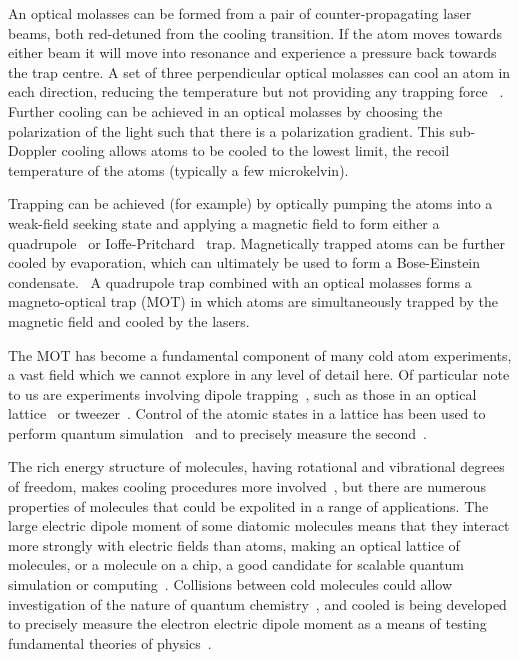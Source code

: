 An optical molasses can be formed from a pair of counter-propagating laser
beams, both red-detuned from the cooling transition. If the atom moves towards
either beam it will move into resonance and experience a pressure back towards
the trap centre. A set of three perpendicular optical molasses can cool an atom
in each direction, reducing the temperature but not providing any trapping
force~\cite{Metcalf1999} . Further cooling can be achieved in an optical
molasses by choosing the polarization of the light such that there is a
polarization gradient. This sub-Doppler cooling allows atoms to be cooled to the
lowest limit, the recoil temperature of the atoms (typically a few
microkelvin).~\cite{Dalibard:89}

Trapping can be achieved (for example) by optically pumping the atoms into a
weak-field seeking state and applying a magnetic field to form either a
quadrupole~\cite{PhysRevLett.54.2596} or
Ioffe-Pritchard~\cite{PhysRevLett.51.1336} trap. Magnetically trapped atoms can
be further cooled by evaporation, which can ultimately be used to form a
Bose-Einstein condensate.~\cite{Anderson198} A quadrupole trap combined with an
optical molasses forms a magneto-optical trap (MOT) in which atoms are
simultaneously trapped by the magnetic field and cooled by the
lasers.~\cite{PhysRevLett.59.2631}

The MOT has become a fundamental component of many cold atom experiments, a vast
field which we cannot explore in any level of detail here. Of particular note to
us are experiments involving dipole trapping~\cite{PhysRevA.47.R4567}, such as
those in an optical lattice~\cite{Bakr2009} or tweezer~\cite{Ashkin:86}. Control
of the atomic states in a lattice has been used to perform quantum
simulation~\cite{Gross995} and to precisely measure the
second~\cite{Campbell90}.

The rich energy structure of molecules, having rotational and vibrational
degrees of freedom, makes cooling procedures more involved~\cite{Tarbutt2018},
but there are numerous properties of molecules that could be expolited in a
range of applications. The large electric dipole moment of some diatomic
molecules means that they interact more strongly with electric fields than
atoms, making an optical lattice of molecules, or a molecule on a chip, a good
candidate for scalable quantum simulation or computing~\cite{Micheli2006,
Andre2006}.  Collisions between cold molecules could allow investigation of the
nature of quantum chemistry~\cite{Krems2008}, and cooled \YbF{} is being
developed to precisely measure the electron electric dipole moment as a means of
testing fundamental theories of physics~\cite{Lim2018}.

